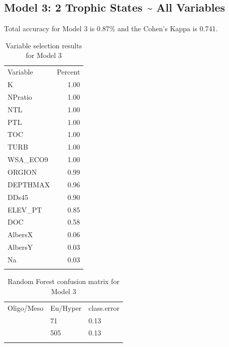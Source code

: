 \documentclass[11pt,]{article}
\begin{document}
\subsection{Model 3: 2 Trophic States \textasciitilde{} All
Variables}\label{model-3-2-trophic-states-all-variables}

Total accuracy for Model 3 is 0.87\% and the Cohen's Kappa is 0.741.

\begin{longtable}[c]{@{}lr@{}}
\toprule\addlinespace
Variable & Percent
\\\addlinespace
\midrule\endhead
K & 1.00
\\\addlinespace
NPratio & 1.00
\\\addlinespace
NTL & 1.00
\\\addlinespace
PTL & 1.00
\\\addlinespace
TOC & 1.00
\\\addlinespace
TURB & 1.00
\\\addlinespace
WSA\_ECO9 & 1.00
\\\addlinespace
ORGION & 0.99
\\\addlinespace
DEPTHMAX & 0.96
\\\addlinespace
DDs45 & 0.90
\\\addlinespace
ELEV\_PT & 0.85
\\\addlinespace
DOC & 0.58
\\\addlinespace
AlbersX & 0.06
\\\addlinespace
AlbersY & 0.03
\\\addlinespace
Na & 0.03
\\\addlinespace
\bottomrule
\addlinespace
\caption{Variable selection results for Model 3}
\end{longtable}

\begin{longtable}[c]{@{}lll@{}}
\toprule\addlinespace
Oligo/Meso & Eu/Hyper & class.error
\\\addlinespace
\midrule\endhead
489 & 71 & 0.13
\\\addlinespace
77 & 505 & 0.13
\\\addlinespace
\bottomrule
\addlinespace
\caption{Random Forest confusion matrix for Model 3}
\end{longtable}
\end{document}
